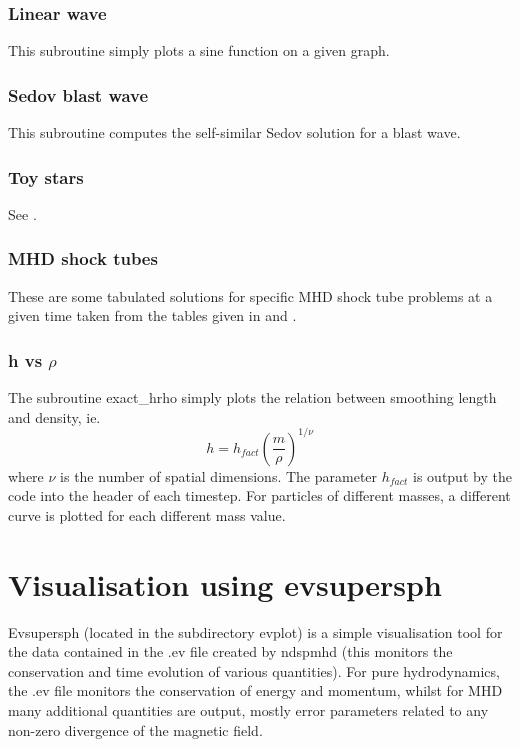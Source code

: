 \documentclass[a4paper,12pt]{article}
\begin{document}
\subsubsection{Linear wave}
 This subroutine simply plots a sine function on a given graph.

\subsubsection{Sedov blast wave}
 This subroutine computes the self-similar Sedov solution for a blast wave.

\subsubsection{Toy stars}
 See \citet{mp04}.

\subsubsection{MHD shock tubes}
 These are some tabulated solutions for specific MHD shock tube problems at a
given time taken from the tables given in \citet{dw94} and \citet{rj95}.

\subsubsection{h vs $\rho$}
 The subroutine exact\_hrho simply plots the relation between smoothing length
and density, ie.
\begin{equation}
h = h_{fact} \left(\frac{m}{\rho}\right)^{1/\nu}
\end{equation}
where $\nu$ is the number of spatial dimensions. The parameter $h_{fact}$ is
output by the code into the header of each timestep. For particles of different
masses, a different curve is plotted for each different mass value.

\section{Visualisation using evsupersph}
 Evsupersph (located in the subdirectory evplot) is a simple visualisation tool for the data contained in the
.ev file created by ndspmhd (this monitors the conservation and time evolution
of various quantities). For pure hydrodynamics, the .ev file monitors the
conservation of energy and momentum, whilst for MHD many additional quantities
are output, mostly error parameters related to any non-zero divergence of the
magnetic field.
\end{document}
